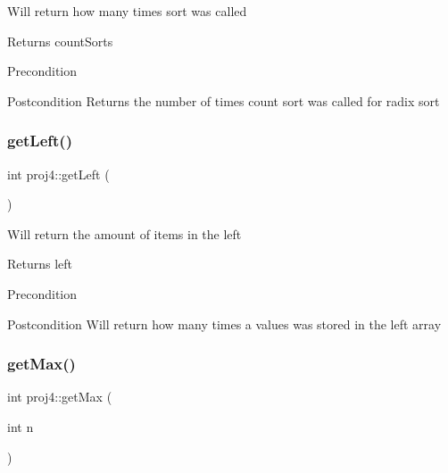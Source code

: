 Will return how many times sort was called \begin{DoxyReturn}{Returns}
count\+Sorts 
\end{DoxyReturn}
\begin{DoxyPrecond}{Precondition}

\end{DoxyPrecond}
\begin{DoxyPostcond}{Postcondition}
Returns the number of times count sort was called for radix sort 
\end{DoxyPostcond}
\mbox{\label{classproj4_a58e2adfdc732a2533990ad44bc75f1d8}} 
\subsubsection{\texorpdfstring{get\+Left()}{getLeft()}}
{\footnotesize\ttfamily int proj4\+::get\+Left (\begin{DoxyParamCaption}{ }\end{DoxyParamCaption})}

Will return the amount of items in the left \begin{DoxyReturn}{Returns}
left 
\end{DoxyReturn}
\begin{DoxyPrecond}{Precondition}

\end{DoxyPrecond}
\begin{DoxyPostcond}{Postcondition}
Will return how many times a values was stored in the left array 
\end{DoxyPostcond}
\mbox{\label{classproj4_a5268b0050f09ac4db2896a39e2ea850d}} 
\subsubsection{\texorpdfstring{get\+Max()}{getMax()}}
{\footnotesize\ttfamily int proj4\+::get\+Max (\begin{DoxyParamCaption}\item[{int}]{n }\end{DoxyParamCaption})}

